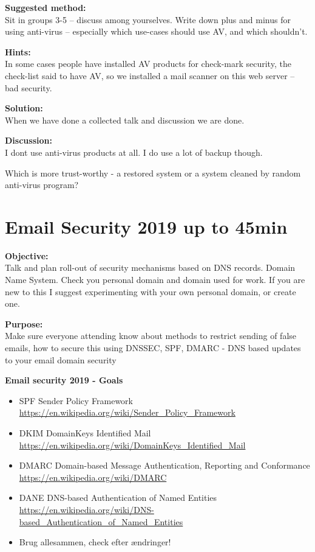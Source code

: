 \documentclass[a4paper,11pt,notitlepage]{report}
\begin{document}
{\bf Suggested method:}\\
Sit in groups 3-5 -- discuss among yourselves. Write down plus and minus for using anti-virus -- especially which use-cases should use AV, and which shouldn't.

{\bf Hints:}\\
In some cases people have installed AV products for check-mark security, the check-list said to have AV, so we installed a mail scanner on this web server -- bad security.

{\bf Solution:}\\
When we have done a collected talk and discussion we are done.

{\bf Discussion:}\\
I dont use anti-virus products at all. I do use a lot of backup though.

Which is more trust-worthy - a restored system or a system cleaned by random anti-virus program?






\chapter{Email Security 2019 up to 45min}
\label{ex:email-security}

{\bf Objective:}\\
Talk and plan roll-out of security mechanisms based on DNS records. Domain Name System. Check you personal domain and domain used for work. If you are new to this I suggest experimenting with your own personal domain, or create one.

{\bf Purpose:}\\
Make sure everyone attending know about methods to restrict sending of false emails, how to secure this using DNSSEC, SPF, DMARC - DNS based updates to your email domain security


{\bf Email security 2019 - Goals}

\begin{itemize}
\item SPF Sender Policy Framework\\ {\footnotesize\url{https://en.wikipedia.org/wiki/Sender_Policy_Framework}}
\item DKIM DomainKeys Identified Mail\\
{\footnotesize\url{https://en.wikipedia.org/wiki/DomainKeys_Identified_Mail}}
\item DMARC Domain-based Message Authentication, Reporting and Conformance\\
{\footnotesize\url{https://en.wikipedia.org/wiki/DMARC}}
\item DANE DNS-based Authentication of Named Entities\\ {\footnotesize\url{https://en.wikipedia.org/wiki/DNS-based_Authentication_of_Named_Entities}}
\item Brug allesammen, check efter ændringer!
\end{itemize}
\end{document}
